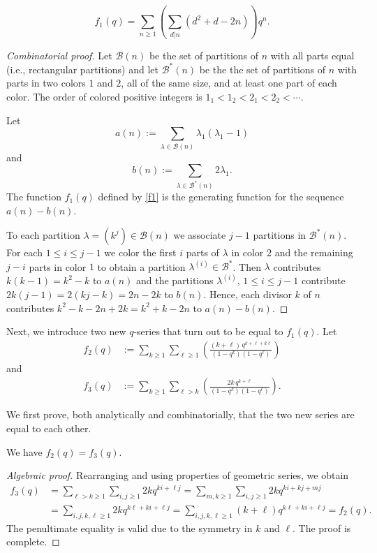 \documentclass[a4paper,reqno,12pt]{amsart}
\begin{document}
\begin{lemma}
$$f_1(q)=\sum_{n\geq1} \left(\sum_{d\vert n} (d^2+d-2n)\right)q^n.$$
\end{lemma}

\begin{proof}[Combinatorial proof]
Let $\mathcal B(n)$ be the set of partitions of $n$ with all parts equal (i.e., rectangular partitions) and let $\mathcal B^*(n)$ be the the set of partitions of $n$ with parts in two colors $1$ and $2$, all of the same size, and at least one part of each color. The order of colored positive integers is $1_1<1_2<2_1<2_2<\cdots $. 

Let $$a(n):=\sum_{\lambda\in \mathcal B(n)}\lambda_1(\lambda_1-1)$$ and $$b(n):=\sum_{\lambda\in \mathcal B^*(n)}2\lambda_1.$$
The function $f_1(q)$ defined by \eqref{f1} is the generating function for the sequence $a(n)-b(n)$. 

\smallskip
\noindent
To each partition $\lambda=(k^j)\in \mathcal B(n)$ we associate $j-1$ partitions in $\mathcal B^*(n)$. For each $1\leq i\leq j-1$ we color the first $i$ parts of $\lambda$ in color $2$ and the remaining $j-i$ parts in color $1$ to obtain a partition $\lambda^{(i)}\in \mathcal B^*$. Then $\lambda$ contributes $k(k-1)=k^2-k$ to $a(n)$ and the partitions $\lambda^{(i)}$, $1\leq i\leq j-1$ contribute $2k(j-1)=2(kj-k)=2n-2k$ to $b(n)$. Hence, each divisor $k$ of $n$ contributes $k^2-k-2n+2k=k^2+k-2n$ to $a(n)-b(n)$. 
\end{proof}

\bigskip
\noindent
Next, we introduce two new $q$-series that turn out to be equal to $f_1(q)$. Let
\begin{align*}
f_2(q)&:=\sum_{k\geq1}\sum_{\ell\geq1}
\left(\frac{(k+\ell)\,q^{k+\ell+k \ell}}{(1-q^k)(1-q^{\ell})}\right)\end{align*} and
\begin{align*} f_3(q)&:=\sum_{k\geq1}\sum_{\ell>k}
\left(\frac{2k\,q^{k+\ell}}{(1-q^k)(1-q^{\ell})}\right).
\end{align*}

We first prove, both analytically and combinatorially, that the two new series are equal to each other. 
\begin{theorem} We have $f_2(q)=f_3(q)$.
\end{theorem}
\begin{proof}[Algebraic proof] Rearranging and using properties of geometric series, we obtain
\begin{align*}  f_3(q) &= \sum_{\ell>k\geq1}\sum_{i,j\geq1} 2kq^{ki+\ell j} = \sum_{m,k\geq1}\sum_{i,j\geq1} 2kq^{ki+kj+mj}   \\
&  =\sum_{i,j,k,\ell\geq1} 2kq^{k\ell+ki+\ell j} = \sum_{i,j,k,\ell\geq1} (k+\ell)q^{k\ell+ki+\ell j}  = f_2(q).
\end{align*}
The penultimate equality is valid due to the symmetry in $k$ and $\ell$.
The proof is complete. 
\end{proof}
\end{document}

